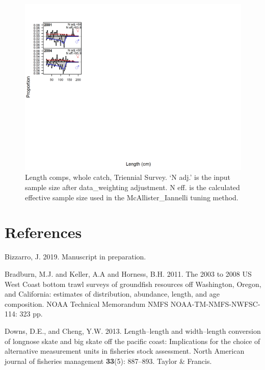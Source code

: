 \documentclass[12pt,]{article}
\begin{document}
\begin{figure}
\centering
\includegraphics{./r4ss/plots_mod1/comp_lenfit_flt6mkt0.png}
\caption{Length comps, whole catch, Triennial Survey. `N adj.' is the
input sample size after data\_weighting adjustment. N eff. is the
calculated effective sample size used in the McAllister\_Iannelli tuning
method. \label{fig:mod1_4_comp_lenfit_flt6mkt0}}
\end{figure}

\newpage

\color{black}

\hypertarget{references}{%
\section*{References}\label{references}}

\renewcommand{\thepage}{}

\hypertarget{refs}{}
\leavevmode\hypertarget{ref-Bizzarro2019}{}%
Bizzarro, J. 2019. Manuscript in preparation.

\leavevmode\hypertarget{ref-Bradburn2011}{}%
Bradburn, M.J. and Keller, A.A and Horness, B.H. 2011. The 2003 to 2008
US West Coast bottom trawl surveys of groundfish resources off
Washington, Oregon, and California: estimates of distribution,
abundance, length, and age composition. NOAA Technical Memorandum NMFS
NOAA-TM-NMFS-NWFSC-114: 323 pp.

\leavevmode\hypertarget{ref-Downs2013}{}%
Downs, D.E., and Cheng, Y.W. 2013. Length--length and width--length
conversion of longnose skate and big skate off the pacific coast:
Implications for the choice of alternative measurement units in
fisheries stock assessment. North American journal of fisheries
management \textbf{33}(5): 887--893. Taylor \& Francis.
\end{document}
